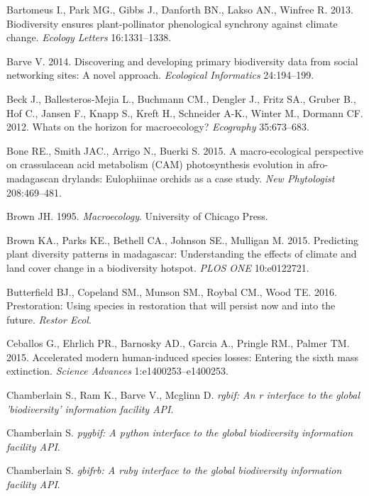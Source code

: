 \documentclass[author-year, review, 11pt]{components/elsarticle} %
\begin{document}
\hypertarget{ref-Bartomeus_2013}{}
Bartomeus I., Park MG., Gibbs J., Danforth BN., Lakso AN., Winfree R.
2013. Biodiversity ensures plant-pollinator phenological synchrony
against climate change. \emph{Ecology Letters} 16:1331--1338.

\hypertarget{ref-Barve_2014}{}
Barve V. 2014. Discovering and developing primary biodiversity data from
social networking sites: A novel approach. \emph{Ecological Informatics}
24:194--199.

\hypertarget{ref-Beck_2012}{}
Beck J., Ballesteros-Mejia L., Buchmann CM., Dengler J., Fritz SA.,
Gruber B., Hof C., Jansen F., Knapp S., Kreft H., Schneider A-K., Winter
M., Dormann CF. 2012. Whats on the horizon for macroecology?
\emph{Ecography} 35:673--683.

\hypertarget{ref-Bone_2015}{}
Bone RE., Smith JAC., Arrigo N., Buerki S. 2015. A macro-ecological
perspective on crassulacean acid metabolism (CAM) photosynthesis
evolution in afro-madagascan drylands: Eulophiinae orchids as a case
study. \emph{New Phytologist} 208:469--481.

\hypertarget{ref-Brown_1995}{}
Brown JH. 1995. \emph{Macroecology}. University of Chicago Press.

\hypertarget{ref-Brown_2015}{}
Brown KA., Parks KE., Bethell CA., Johnson SE., Mulligan M. 2015.
Predicting plant diversity patterns in madagascar: Understanding the
effects of climate and land cover change in a biodiversity hotspot.
\emph{PLOS ONE} 10:e0122721.

\hypertarget{ref-Butterfield_2016}{}
Butterfield BJ., Copeland SM., Munson SM., Roybal CM., Wood TE. 2016.
Prestoration: Using species in restoration that will persist now and
into the future. \emph{Restor Ecol}.

\hypertarget{ref-Ceballos_2015}{}
Ceballos G., Ehrlich PR., Barnosky AD., Garcia A., Pringle RM., Palmer
TM. 2015. Accelerated modern human-induced species losses: Entering the
sixth mass extinction. \emph{Science Advances} 1:e1400253--e1400253.

\hypertarget{ref-rgbif}{}
Chamberlain S., Ram K., Barve V., Mcglinn D. \emph{rgbif: An r interface
to the global 'biodiversity' information facility API}.

\hypertarget{ref-pygbif}{}
Chamberlain S. \emph{pygbif: A python interface to the global
biodiversity information facility API}.

\hypertarget{ref-gbifrb}{}
Chamberlain S. \emph{gbifrb: A ruby interface to the global biodiversity
information facility API}.
\end{document}

